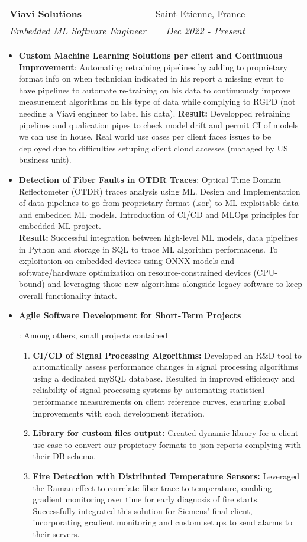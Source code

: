 \documentclass[letterpaper,11pt]{article}
\makeatletter
\newcommand{\resumeItem}[2]{
  \item\small{
    \textbf{#1}{: #2 \vspace{-2pt}}
  }
}
\newcommand{\resumeSubheading}[4]{
  \vspace{-1pt}\item
    \begin{tabular*}{0.97\textwidth}[t]{l@{\extracolsep{\fill}}r}
      \textbf{#1} & #2 \\
      \textit{\small#3} & \textit{\small #4} \\
    \end{tabular*}\vspace{-5pt}
}
\newcommand{\resumeItemListStart}{\begin{itemize}}
\newcommand{\resumeItemListEnd}{\end{itemize}\vspace{-5pt}}
\makeatother
\begin{document}
    \resumeSubheading
      {Viavi Solutions}{Saint-Etienne, France}
      {Embedded ML Software Engineer}{Dec 2022 - Present}
      \resumeItemListStart
      \resumeItem{Custom Machine Learning Solutions per client and Continuous Improvement}
        { Automating retraining pipelines by adding to proprietary format info on when technician indicated in his report a missing event to have pipelines to automate re-training
        on his data to continuously improve measurement algorithms on his type of data while complying to RGPD (not needing a Viavi engineer to label his data).
        \textbf{Result:} Developped retraining pipelines and qualication pipes to check model drift and permit CI of models we can use in house. 
        Real world use cases per client faces issues to be deployed due to difficulties setuping client cloud accesses (managed by US business unit). }
        \resumeItem{Detection of Fiber Faults in OTDR Traces}
          {Optical Time Domain Reflectometer (OTDR) traces analysis using ML. Design and Implementation of data pipelines to go from proprietary format (.sor) to ML exploitable data and embedded ML models. Introduction of CI/CD and MLOps principles for embedded ML project.
          \\ \textbf{Result:} Successful integration between high-level ML models, data pipelines in Python and storage in SQL to trace ML algorithm performacens. To exploitation on embedded devices using ONNX models and software/hardware optimization on resource-constrained devices (CPU-bound) and leveraging those new algorithms alongside legacy software to keep overall functionality intact.}
      \resumeItem{Agile Software Development for Short-Term Projects}
        {Among others, small projects contained
          \begin{enumerate}
            \item \textbf{CI/CD of Signal Processing Algorithms:} Developed an R\&D tool to automatically assess performance changes in signal processing algorithms using a dedicated mySQL database. Resulted in improved efficiency and reliability of signal processing systems by automating statistical performance measurements on client reference curves, ensuring global improvements with each development iteration.
            \item \textbf{Library for custom files output:} Created dynamic library for a client use case to convert our propietary formats to json reports complying with their DB schema.
            \item \textbf{Fire Detection with Distributed Temperature Sensors:} Leveraged the Raman effect to correlate fiber trace to temperature, enabling gradient monitoring over time for early diagnosis of fire starts. Successfully integrated this solution for Siemens' final client, incorporating gradient monitoring and custom setups to send alarms to their servers.
          \end{enumerate}
        }
      \resumeItemListEnd
\end{document}
